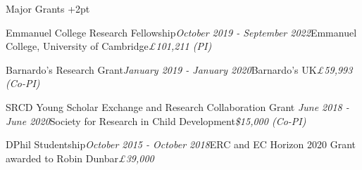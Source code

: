 \documentclass{resume} %
\begin{document}
\begin{rSection}{Major Grants} \itemsep +2pt
\begin{rSubsection}{Emmanuel College Research Fellowship}{\em October 2019 - September 2022}{Emmanuel College, University of Cambridge}{\hfill {\em \pounds 101,211 (PI)}}
\item[]\vspace{-1.5\baselineskip}
\end{rSubsection}

\begin{rSubsection}{Barnardo's Research Grant}{\em January 2019 - January 2020}{Barnardo's UK}{\hfill {\em \pounds 59,993 (Co-PI)}}
\item[]\vspace{-1.5\baselineskip}
\end{rSubsection}

\begin{rSubsection}{SRCD Young Scholar Exchange and Research Collaboration Grant }{\em June 2018 - June 2020}{Society for Research in Child Development}{\hfill {\em \$15,000 (Co-PI)}}
\item[]\vspace{-1.5\baselineskip}
\end{rSubsection}

\begin{rSubsection}{DPhil Studentship}{\em October 2015 - October 2018}{ERC and EC Horizon 2020 Grant awarded to Robin Dunbar}{\hfill {\em \pounds 39,000}}
\item[]\vspace{-1.5\baselineskip}
\end{rSubsection}


\end{rSection}
\end{document}
